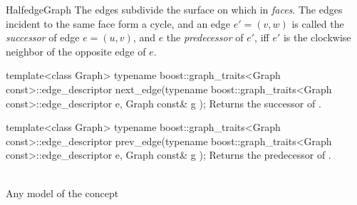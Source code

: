 \begin{ccRefConcept}{HalfedgeGraph}
The edges subdivide the surface on which in {\em faces}. The edges
incident to the same face form a cycle, and an edge $e'=(v,w)$ is called
the {\em successor} of edge $e=(u,v)$, and $e$ the {\em 
predecessor} of $e'$, iff $e'$ is the clockwise neighbor of
the opposite edge of $e$.
 

  \ccFunction
  {template<class Graph>
  typename boost::graph_traits<Graph const>::edge_descriptor 
  next_edge(typename boost::graph_traits<Graph const>::edge_descriptor e, Graph const& g );
  }
  {Returns the successor of .}
  
  \ccFunction
  {template<class Graph>
  typename boost::graph_traits<Graph const>::edge_descriptor 
  prev_edge(typename boost::graph_traits<Graph const>::edge_descriptor e, Graph const& g );
  }
  {Returns the predecessor of .}

\ccHasModels
{}\\
Any model of the concept \\

\end{ccRefConcept}

